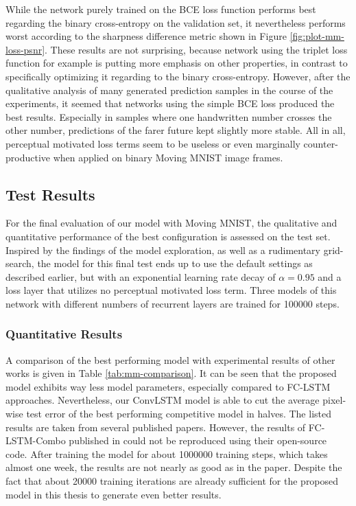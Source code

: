While the network purely trained on the BCE loss function performs best regarding the binary cross-entropy on the validation set, it nevertheless performs worst according to the sharpness difference metric shown in Figure \ref{fig:plot-mm-loss-psnr}. These results are not surprising, because network using the triplet loss function for example is putting more emphasis on other properties, in contrast to specifically optimizing it regarding to the binary cross-entropy. However, after the qualitative analysis of many generated prediction samples in the course of the experiments, it seemed that networks using the simple BCE loss produced the best results. Especially in samples where one handwritten number crosses the other number, predictions of the farer future kept slightly more stable. All in all, perceptual motivated loss terms seem to be useless or even marginally counter-productive when applied on binary Moving MNIST image frames. 

\subsection{Test Results}

For the final evaluation of our model with Moving MNIST, the qualitative and quantitative performance of the best configuration is assessed on the test set. Inspired by the findings of the model exploration, as well as a rudimentary grid-search, the model for this final test ends up to use the default settings as described earlier, but with an exponential learning rate decay of $\alpha=0.95$ and a loss layer that utilizes no perceptual motivated loss term. Three models of this network with different numbers of recurrent layers are trained for \num{100000} steps.


\subsubsection{Quantitative Results}

A comparison of the best performing model with experimental results of other works is given in Table \ref{tab:mm-comparison}. It can be seen that the proposed model exhibits way less model parameters, especially compared to FC-LSTM approaches. Nevertheless, our ConvLSTM model is able to cut the average pixel-wise test error of the best performing competitive model in halves. The listed results are taken from several published papers. However, the results of FC-LSTM-Combo published in \parencite{unsup_learn_lstm} could not be reproduced using their open-source code. After training the model for about \num{1000000} training steps, which takes almost one week, the results are not nearly as good as in the paper. Despite the fact that about \num{20000} training iterations are already sufficient for the proposed model in this thesis to generate even better results.

